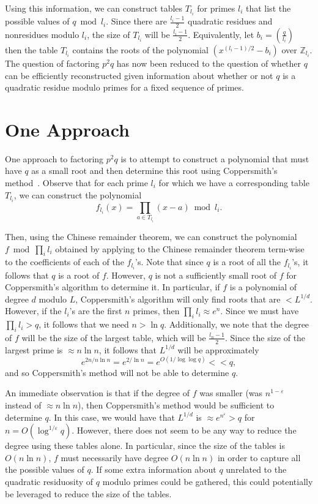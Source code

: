 \documentclass[letterpaper,twocolumn,10pt]{article}
\begin{document}
Using this information, we can construct tables $T_{l_i}$ for primes $l_i$ that list the possible values of $q \bmod l_i$. Since there are $\frac{l_i - 1}{2}$ quadratic residues and nonresidues modulo $l_i$, the size of $T_{l_i}$ will be $\frac{l_i - 1}{2}$. Equivalently, let $b_i =  \left(\frac{q}{l_i}\right)$ then the table $T_{l_i}$ contains the roots of the polynomial $(x^{(l_i - 1)/2} - b_i)$ over $\mathbb{Z}_{l_i}$. The question of factoring $p^2 q$ has now been reduced to the question of whether $q$ can be efficiently reconstructed given information about whether or not $q$ is a quadratic residue modulo primes for a fixed sequence of primes. 

\section{One Approach}

One approach to factoring $p^2 q$ is to attempt to construct a polynomial that must have $q$ as a small root and then determine this root using Coppersmith's method~\cite{Coppersmith}. Observe that for each prime $l_i$ for which we have a corresponding table $T_{l_i}$, we can construct the polynomial
\[
f_{l_i}(x) = \prod_{a \in T_{l_i}} (x - a) \bmod l_i.
\]

Then, using the Chinese remainder theorem, we can construct the polynomial $f \bmod \prod_i l_i$ obtained by applying to the Chinese remainder theorem term-wise to the coefficients of each of the $f_{l_i}$'s. Note that since $q$ is a root of all the $f_{l_i}$'s, it follows that $q$ is a root of $f$. However, $q$ is not a sufficiently small root of $f$ for Coppersmith's algorithm to determine it. In particular, if $f$ is a polynomial of degree $d$ modulo $L$, Coppersmith's algorithm will only find roots that are $< L^{1/d}$. However, if the $l_i$'s are the first $n$ primes, then $\prod_i l_i \approx e^n$. Since we must have $\prod_i l_i > q$, it follows that we need $n > \ln q$. Additionally, we note that the degree of $f$ will be the size of the largest table, which will be $\frac{l_n - 1}{2}$. Since the size of the largest prime is $\approx n \ln n$, it follows that $L^{1/d}$ will be approximately
\[
e^{2n/n\ln n} = e^{2/\ln n} = e^{O(1/\log \log q)}  << q,
\]  
and so Coppersmith's method will not be able to determine $q$.

An immediate observation is that if the degree of $f$ was smaller (was $n^{1 - \varepsilon}$ instead of $\approx n \ln n$), then Coppersmith's method would be sufficient to determine $q$. In this case, we would have that $L^{1/d}$ is $\approx e^{n^{\varepsilon}} > q$ for $n = O(\log^{1/\varepsilon} q)$. However, there does not seem to be any way to reduce the degree using these tables alone. In particular, since the size of the tables is $O(n \ln n)$, $f$ must necessarily have degree $O(n \ln n)$ in order to capture all the possible values of $q$. If some extra information about $q$ unrelated to the quadratic residuosity of $q$ modulo primes could be gathered, this could potentially be leveraged to reduce the size of the tables. 
\end{document}
